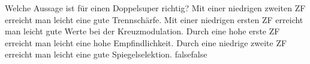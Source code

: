     {Welche Aussage ist für einen Doppelsuper richtig?}
    {Mit einer niedrigen zweiten ZF erreicht man leicht eine gute Trennschärfe.}
    {Mit einer niedrigen ersten ZF erreicht man leicht gute Werte bei der Kreuzmodulation.}
    {Durch eine hohe erste ZF erreicht man leicht eine hohe Empfindlichkeit.}
    {Durch eine niedrige zweite ZF erreicht man leicht eine gute Spiegelselektion.}
    {false}{false}